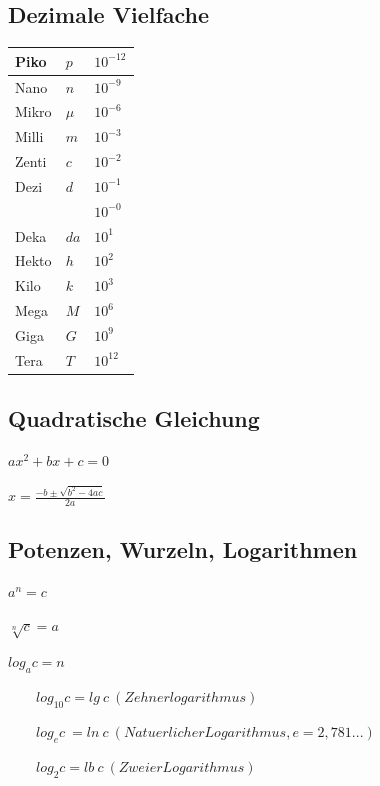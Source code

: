 \documentclass[12pt,a4paper]{article}
\begin{document}
\subsection{Dezimale Vielfache}
\begin{tabular}{|l|l|l|}
\hline
Piko&$p$&$10^{-12}$\\
\hline
Nano&$n$&$10^{-9}$\\
\hline
Mikro&$\mu$&$10^{-6}$\\
\hline
Milli&$m$&$10^{-3}$\\
\hline
Zenti&$c$&$10^{-2}$\\
\hline
Dezi&$d$&$10^{-1}$\\
\hline
&&$10^{-0}$\\
\hline
Deka&$da$&$10^{1}$\\
\hline
Hekto&$h$&$10^{2}$\\
\hline
Kilo&$k$&$10^{3}$\\
\hline
Mega&$M$&$10^{6}$\\
\hline
Giga&$G$&$10^{9}$\\
\hline
Tera&$T$&$10^{12}$\\
\hline
\end{tabular}

\subsection{Quadratische Gleichung}
\begin{description}
\item $ax^{2}+bx+c=0$
\item $x=\frac{-b\pm \sqrt{b^{2}-4ac}}{2a}$
\end{description}

\subsection{Potenzen, Wurzeln, Logarithmen}
\begin{description}
\item $a^{n}=c$
\item $\sqrt[n]{c}=a$
\item $log_{a}c=n$
\item ~~~~$log_{10}c = lg~c~(Zehnerlogarithmus)$
\item ~~~~$log_{e}c ~= ln~c~(Natuerlicher Logarithmus, e=2,781...)$
\item ~~~~$log_{2}c = lb~c~(Zweier Logarithmus)$
\end{description}

\pagebreak
\end{document}
